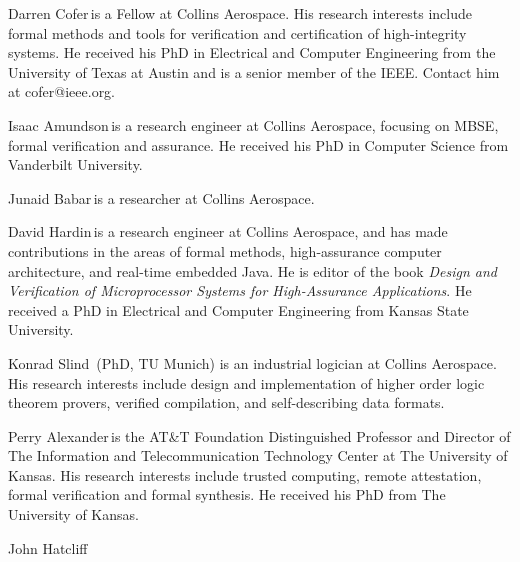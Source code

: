 \begin{IEEEbiography}{Darren Cofer}{\,}is a Fellow at Collins Aerospace. His research interests include formal methods and tools for verification and certification of high-integrity systems. He received his PhD in Electrical and Computer Engineering from the University of Texas at Austin and is a senior member of the IEEE. Contact him at cofer@ieee.org.
\end{IEEEbiography}

\begin{IEEEbiography}{Isaac Amundson}{\,}is a research engineer at Collins Aerospace, focusing on MBSE, formal verification and assurance.  He received his PhD in Computer Science from Vanderbilt University.
\end{IEEEbiography}

\begin{IEEEbiography}{Junaid Babar}{\,}is a researcher at Collins Aerospace.
\end{IEEEbiography}

\begin{IEEEbiography}{David Hardin}{\,}is a research engineer
  at Collins Aerospace, and has made contributions in
  the areas of formal methods, high-assurance computer architecture,
  and real-time embedded Java.  He is editor of the book \emph{Design
    and Verification of Microprocessor Systems for High-Assurance
    Applications}.  He received a PhD in Electrical and Computer
  Engineering from Kansas State University.
\end{IEEEbiography}

\begin{IEEEbiography}{Konrad Slind}{\,} (PhD, TU Munich) is an industrial logician at Collins Aerospace.
  His research interests include design and implementation of higher
  order logic theorem provers, verified compilation, and
  self-describing data formats.
\end{IEEEbiography}

\begin{IEEEbiography}{Perry Alexander}{\,}is the AT\&T Foundation
  Distinguished Professor and Director of The Information and
  Telecommunication Technology Center at The University of Kansas.
  His research interests include trusted computing, remote
  attestation, formal verification and formal synthesis. He received
  his PhD from The University of Kansas.
\end{IEEEbiography}

\begin{IEEEbiography}{John Hatcliff}{\,}
\end{IEEEbiography}

